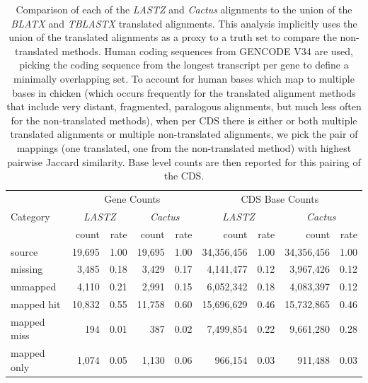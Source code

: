 \documentclass{article}
\begin{document}
\begin{table}[!htb]
\begin{center}
\begin{tabular}{l|r|r|r|r|r|r|r|r}
\multicolumn{1}{c}{} & \multicolumn{4}{c|}{Gene Counts} & \multicolumn{4}{c}{CDS Base Counts} \\
\cmidrule{2-5} \cmidrule{6-9}
Category         & \multicolumn{2}{c|}{\textit{LASTZ}} & \multicolumn{2}{c|}{\textit{Cactus}}
                 & \multicolumn{2}{c|}{\textit{LASTZ}} & \multicolumn{2}{c}{\textit{Cactus}} \\
                 & count  & rate & count  & rate   & count  & rate & count  & rate   \\
  \midrule
source           & 19,695 & 1.00 & 19,695 & 1.00   & 34,356,456 & 1.00 & 34,356,456 & 1.00 \\
missing          & 3,485  & 0.18 & 3,429  & 0.17   & 4,141,477  & 0.12 & 3,967,426  & 0.12 \\
unmapped         & 4,110  & 0.21 & 2,991  & 0.15   & 6,052,342  & 0.18 & 4,083,397  & 0.12 \\
mapped hit       & 10,832 & 0.55 & 11,758 & 0.60   & 15,696,629 & 0.46 & 15,732,865 & 0.46 \\
mapped miss      & 194    & 0.01 & 387    & 0.02   & 7,499,854  & 0.22 & 9,661,280  & 0.28 \\
mapped only      & 1,074  & 0.05 & 1,130  & 0.06   & 966,154    & 0.03 & 911,488    & 0.03 \\
\end{tabular}
\caption{ %
Comparison of each of the \textit{LASTZ} and \textit{Cactus} alignments to the union of the \textit{BLATX} and
  \textit{TBLASTX} translated alignments.  This analysis implicitly uses the union of the translated
  alignments as a proxy to a truth set to compare the non-translated methods.  
  Human coding sequences from GENCODE V34 are used, picking the coding sequence from the longest transcript per gene to define a minimally overlapping set.
  To account for human bases which map to multiple bases in chicken (which occurs frequently for the translated alignment methods that include very distant, fragmented, paralogous alignments, but much less often for the non-translated methods), 
  when per CDS there is either or both multiple translated alignments or multiple non-translated alignments, we pick the pair of mappings (one translated, one from the non-translated method) with highest pairwise Jaccard similarity. Base level counts are then reported for this pairing of the CDS.  
}
\end{center}
\end{table}
\end{document}
